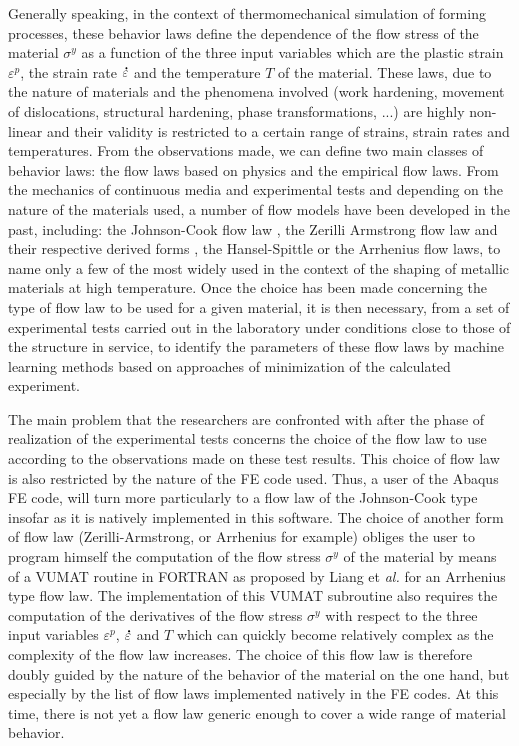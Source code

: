 \documentclass[algorithms,article,submit,pdftex,moreauthors]{Definitions/mdpi}
\makeatletter
\DeclareRobustCommand{\mdot}[1]{\accentset{\mbox{\bfseries .}}{#1}}
\DeclareRobustCommand{\eal}{et \emph{al.}\@\xspace}
\makeatother
\begin{document}
Generally speaking, in the context of thermomechanical simulation of forming processes, these behavior laws define the dependence of the flow stress of the material $\sigma^y$ as a function of the three input variables which are the plastic strain $\varepsilon^p$, the strain rate $\mdot\varepsilon$ and the temperature $T$ of the material.
These laws, due to the nature of materials and the phenomena involved (work hardening, movement of dislocations, structural hardening, phase transformations, ...) are highly non-linear and their validity is restricted to a certain range of strains, strain rates and temperatures.
From the observations made, we can define two main classes of behavior laws: the flow laws based on physics and the empirical flow laws.
From the mechanics of continuous media and experimental tests and depending on the nature of the materials used, a number of flow models have been developed in the past, including: the Johnson-Cook flow law \cite{Johnson-1983}, the Zerilli Armstrong flow law \cite{Zerilli-1987} and their respective derived forms \cite{Rule-1998, Lin-2010, Li-2013, Zhang-2015, Zhou-2019}, the Hansel-Spittle \cite{Hensel-1978} or the Arrhenius \cite{Jonas-1969} flow laws, to name only a few of the most widely used in the context of the shaping of metallic materials at high temperature.
Once the choice has been made concerning the type of flow law to be used for a given material, it is then necessary, from a set of experimental tests carried out in the laboratory under conditions close to those of the structure in service, to identify the parameters of these flow laws by machine learning methods based on approaches of minimization of the calculated experiment.

The main problem that the researchers are confronted with after the phase of realization of the experimental tests concerns the choice of the flow law to use according to the observations made on these test results.
This choice of flow law is also restricted by the nature of the FE code used.
Thus, a user of the Abaqus FE code, will turn more particularly to a flow law of the Johnson-Cook \cite{Johnson-1983} type insofar as it is natively implemented in this software.
The choice of another form of flow law (Zerilli-Armstrong, or Arrhenius for example) obliges the user to program himself the computation of the flow stress $\sigma^y$ of the material by means of a VUMAT routine in FORTRAN as proposed by Liang \eal \cite{Liang-2022} for an Arrhenius type flow law.
The implementation of this VUMAT subroutine also requires the computation of the derivatives of the flow stress $\sigma^y$ with respect to the three input variables $\varepsilon^p$, $\mdot\varepsilon$ and $T$ which can quickly become relatively complex as the complexity of the flow law increases.
The choice of this flow law is therefore doubly guided by the nature of the behavior of the material on the one hand, but especially by the list of flow laws implemented natively in the FE codes.
At this time, there is not yet a flow law generic enough to cover a wide range of material behavior.
\end{document}
